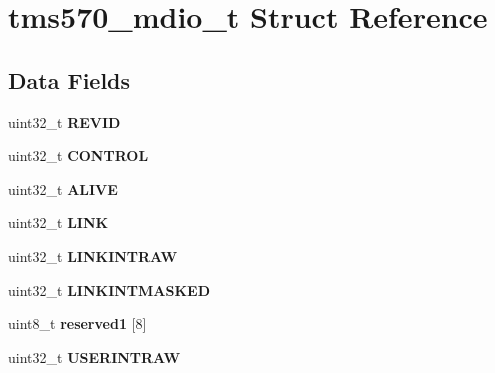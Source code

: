 \hypertarget{structtms570__mdio__t}{}\section{tms570\+\_\+mdio\+\_\+t Struct Reference}
\label{structtms570__mdio__t}
\subsection*{Data Fields}
\begin{DoxyCompactItemize}
\item 
\mbox{\label{structtms570__mdio__t_ab16cb4d05f52df56151d35d0bfd8d7ce}} 
uint32\+\_\+t {\bfseries R\+E\+V\+ID}
\item 
\mbox{\label{structtms570__mdio__t_a2792a9cd40a79b075fb4c54609d5e455}} 
uint32\+\_\+t {\bfseries C\+O\+N\+T\+R\+OL}
\item 
\mbox{\label{structtms570__mdio__t_ab288715c7d406207492c4f5f04407950}} 
uint32\+\_\+t {\bfseries A\+L\+I\+VE}
\item 
\mbox{\label{structtms570__mdio__t_a69af6f92d0d4b7d03a67ee13b02b9500}} 
uint32\+\_\+t {\bfseries L\+I\+NK}
\item 
\mbox{\label{structtms570__mdio__t_a53d60d6e162ca1ff50332a28539cb5ec}} 
uint32\+\_\+t {\bfseries L\+I\+N\+K\+I\+N\+T\+R\+AW}
\item 
\mbox{\label{structtms570__mdio__t_af83da81b5175715afd639972b1592586}} 
uint32\+\_\+t {\bfseries L\+I\+N\+K\+I\+N\+T\+M\+A\+S\+K\+ED}
\item 
\mbox{\label{structtms570__mdio__t_aee3994a4e60ae29aebcda3e98761e507}} 
uint8\+\_\+t {\bfseries reserved1} \mbox{[}8\mbox{]}
\item 
\mbox{\label{structtms570__mdio__t_ad57471988e0f1c7c77e13a840684eeef}} 
uint32\+\_\+t {\bfseries U\+S\+E\+R\+I\+N\+T\+R\+AW}
\item 
\mbox{\label{structtms570__mdio__t_a9b7550ab0848337c3c53eb507d2f3dba}} 

\end{DoxyCompactItemize}

